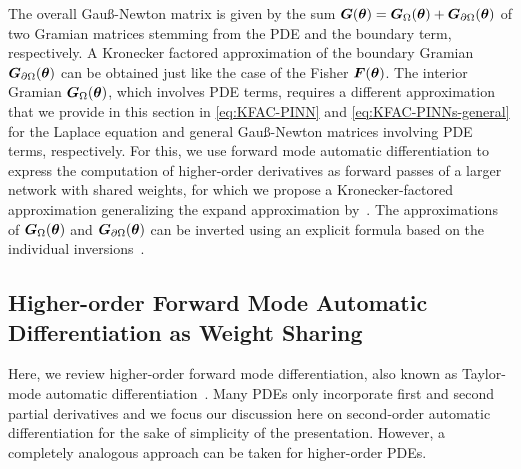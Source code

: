 
The overall Gauß-Newton matrix is given by the sum ${\bm{G}}({\bm{\theta}})= {\bm{G}}_\Omega({\bm{\theta}}) + {\bm{G}}_{\partial\Omega}({\bm{\theta}})$ of two Gramian matrices stemming from the PDE and the boundary term, respectively.
A Kronecker factored approximation of the boundary Gramian ${\bm{G}}_{\partial\Omega}({\bm{\theta}})$ can be obtained just like the case of the  Fisher ${\bm{F}}({\bm{\theta}})$.
The interior Gramian ${\bm{G}}_\Omega({\bm{\theta}})$, which involves PDE terms, requires a different approximation that we provide in this section in \eqref{eq:KFAC-PINN} and \eqref{eq:KFAC-PINNs-general} for the Laplace equation and general Gauß-Newton matrices involving PDE terms, respectively. 
For this, we use forward mode automatic differentiation to express the computation of higher-order derivatives as forward passes of a larger network with shared weights, for which we propose a Kronecker-factored approximation generalizing the expand approximation by~\citet{eschenhagen2023kroneckerfactored}.
The approximations of ${\bm{G}}_{\Omega}({\bm{\theta}})$ and ${\bm{G}}_{\partial\Omega}({\bm{\theta}})$ can be %
inverted using an explicit formula based on the individual inversions~\citep{martens2015optimizing}.

\subsection{Higher-order Forward Mode Automatic Differentiation as Weight Sharing}
\label{sec:taylor-mode-AD}

Here, we review higher-order forward mode differentiation, also known as {Taylor-mode automatic differentiation}~\citep{griewank1996algorithm, griewank2008evaluating, bettencourt2019taylor}.
Many PDEs only incorporate first and second partial derivatives and we focus our discussion here on second-order automatic differentiation for the sake of simplicity of the presentation.
However, a completely analogous approach can be taken for higher-order PDEs.

